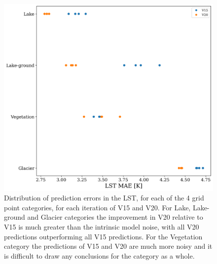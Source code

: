\documentclass[hess, twostagejnl]{copernicus}
\providecommand{\DIFadd}[1]{{\protect\color{blue} \sf #1}} %
\providecommand{\DIFaddbegin}{} %
\providecommand{\DIFaddend}{} %
\providecommand{\DIFaddFL}[1]{\DIFadd{#1}} %
\begin{document}
\DIFaddbegin \begin{figure}
	\includegraphics[width=\columnwidth]{global_shift_plot}
	\caption{\DIFaddFL{Distribution of prediction errors in the LST, for each of the 4 grid point categories, for each iteration of V15 and V20. For Lake, Lake-ground and Glacier categories the improvement in V20 relative to V15 is much greater than the intrinsic model noise, with all V20 predictions outperforming all V15 predictions. For the Vegetation category the predictions of V15 and V20 are much more noisy and it is difficult to draw any conclusions for the category as a whole.}} 
	\label{fig:global_shift_plot}
\end{figure}

\DIFaddend 
\end{document}
